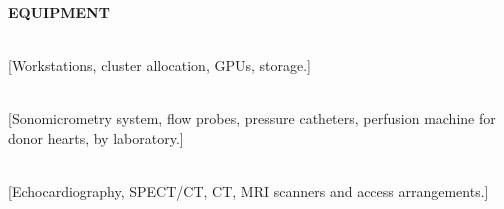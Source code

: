 \documentclass[11pt]{article}
\begin{document}
\textbf{EQUIPMENT}

\\
{}[Workstations, cluster allocation, GPUs, storage.]

\\
{}[Sonomicrometry system, flow probes, pressure catheters, perfusion machine for donor hearts, by laboratory.]

\\
{}[Echocardiography, SPECT/CT, CT, MRI scanners and access arrangements.]
\end{document}
